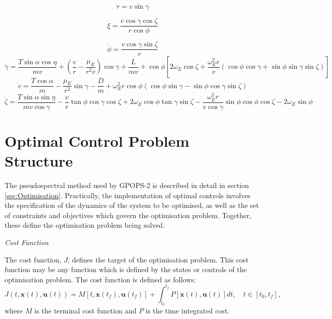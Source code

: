 \begin{equation}
\dot{r} = v \sin \gamma
\end{equation}

\begin{equation}
\dot{\xi} = \frac{v\cos \gamma \cos \zeta}{r \cos \phi}
\end{equation}

\begin{equation}
\dot{\phi} = \frac{v\cos\gamma\sin\zeta}{r}
\end{equation}
\begin{equation}
\dot{\gamma} = \frac{T\sin\alpha \cos\eta}{mv} + (\frac{v}{r}-\frac{\mu_E}{r^2 v})\cos\gamma + \frac{L}{mv}
+ \cos\phi[2\omega_E \cos\zeta + \frac{\omega_E^2 r}{v}(\cos\phi\cos\gamma+\sin\phi\sin\gamma\sin\zeta)]
\end{equation}
\begin{equation}
\dot{v} = \frac{T\cos\alpha}{m}-\frac{\mu_E}{r^2}\sin\gamma - \frac{D}{m}
+ \omega_E^2 r\cos\phi(\cos\phi\sin\gamma-\sin\phi\cos\gamma\sin\zeta)
\end{equation}
\begin{equation}
\dot{\zeta} = \frac{T\sin\alpha \sin\eta}{mv \cos \gamma}-\frac{v}{r}\tan\phi\cos\gamma\cos\zeta +2\omega_E\cos\phi\tan\gamma\sin\zeta - \frac{\omega_E^2 r}{v\cos\gamma}\sin\phi\cos\phi\cos\zeta-2\omega_E\sin\phi 
\end{equation}






\section{Optimal Control Problem Structure}

The pseudospectral method used by GPOPS-2 is described in detail in section \ref{sec:Optimisation}. Practically, the implementation of optimal controls involves the specification of the dynamics of the system to be optimised, as well as the set of constraints and objectives which govern the optimisation problem. 
 Together, these define the optimisation problem being solved.

\noindent \textit{Cost Function}

\noindent The cost function, $J$, defines the target of the optimisation problem. 
This cost function may be any function which is defined by the states or controls of the optimisation problem. The cost function is defined as follows:
\begin{equation} \label{eq:cost}
J(t,\textbf{x}(t),\textbf{u}(t)) = M[t,\textbf{x}(t_f),\textbf{u}(t_f)] +   \int_{t_0}^{t_f} P[\textbf{x}(t),\textbf{u}(t)] dt, \quad t \in [t_0,t_f],
\end{equation}
where $M$ is the terminal cost function and $P$ is the time integrated cost. 

